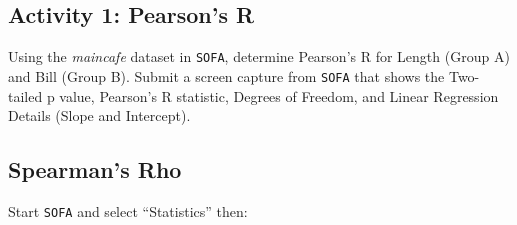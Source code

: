 \subsection{Activity 1: Pearson's R} \label{cor:act01}

Using the \textit{maincafe} dataset in \texttt{SOFA}, determine Pearson's R for Length (Group A) and Bill (Group B). Submit a screen capture from \texttt{SOFA} that shows the Two-tailed p value, Pearson's R statistic, Degrees of Freedom, and Linear Regression Details (Slope and Intercept).

\subsection{Spearman's Rho}\label{cor:spearmans_rho_proc}

Start \texttt{SOFA} and select ``Statistics'' then:

